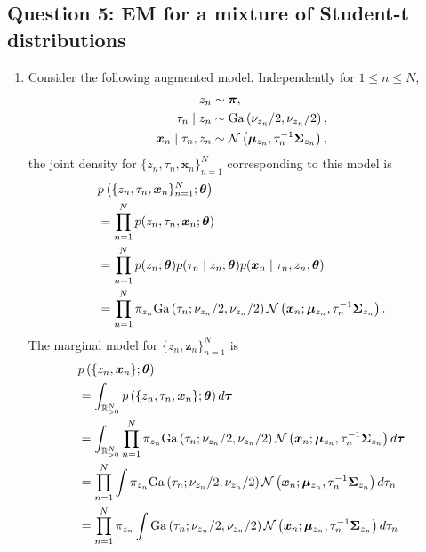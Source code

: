 \subsection*{Question 5: EM for a mixture of Student-t distributions}
\begin{enumerate}[label = (\alph*)]
    \item Consider the following augmented model. Independently for $1 \le n \le N$,
    \begin{align*}
        z_n &\sim \bm{\pi}, \\
        \tau_n\mid z_n &\sim \mathrm{Ga}\left(\nu_{z_n}/2,\nu_{z_n}/2 \right), \\
        \bm{x}_n \mid \tau_n,z_n &\sim {\mathcal N}\left(\bm{\mu}_{z_n}, \tau_n^{-1}\bm{\Sigma}_{z_n}\right), 
    \end{align*}
    the joint density for $\{z_n,\tau_n,\bm{x}_n\}_{n=1}^N$ corresponding to this model is
    \begin{align*}
        &p\left(\{z_n,\tau_n,\bm{x}_n\}_{n=1}^N;\bm{\theta}\right)\\
        &=\prod_{n=1}^N p(z_n,\tau_n,\bm{x}_n;\bm{\theta})\\
        &=\prod_{n=1}^N p(z_n;\bm{\theta})p(\tau_n\mid z_n;\bm{\theta})p(\bm{x}_n\mid \tau_n,z_n;\bm{\theta}) \\
        &=\prod_{n=1}^N \pi_{z_n}\mathrm{Ga}\left(\tau_n; \nu_{z_n}/2, \nu_{z_n}/2\right){\mathcal N}\left(\bm{x}_n; \bm{\mu}_{z_n}, \tau_{n}^{-1}\bm{\Sigma}_{z_n}\right).
    \end{align*}
    The marginal model for $\{z_n,\bm{z}_n\}_{n=1}^N$ is
    \begin{align*}
        &p\left(\{z_n,\bm{x}_n\};\bm{\theta}\right)\\
        &=\int_{\reals_{> 0}^N} p\left(\{z_n,\tau_n,\bm{x}_n\};\bm{\theta}\right)d\bm{\tau}\\
        &=\int_{\reals_{> 0}^N} \prod_{n=1}^N \pi_{z_n}\mathrm{Ga}\left(\tau_n; \nu_{z_n}/2, \nu_{z_n}/2\right)\calN\left(\bm{x}_n; \bm{\mu}_{z_n}, \tau_{n}^{-1}\bm{\Sigma}_{z_n}\right)d\bm{\tau}\\
        &=\prod_{n=1}^N \int  \pi_{z_n}\mathrm{Ga}\left(\tau_n; \nu_{z_n}/2, \nu_{z_n}/2\right)\calN\left(\bm{x}_n; \bm{\mu}_{z_n}, \tau_{n}^{-1}\bm{\Sigma}_{z_n}\right)d\tau_n \\
        &=\prod_{n=1}^N \pi_{z_n}\int  \mathrm{Ga}\left(\tau_n; \nu_{z_n}/2, \nu_{z_n}/2\right)\calN\left(\bm{x}_n; \bm{\mu}_{z_n}, \tau_{n}^{-1}\bm{\Sigma}_{z_n}\right)d\tau_n\\

\end{align*}
\end{enumerate}
